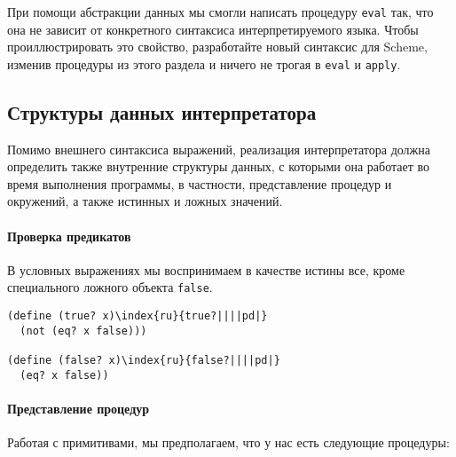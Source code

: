 \begin{exercise}{4.10}%
\label{EX4.10}%
При помощи 
абстракции данных мы смогли написать
процедуру {\tt eval} так, что она не зависит от конкретного
синтаксиса интерпретируемого языка.  
Чтобы проиллюстрировать это свойство,
разработайте новый синтаксис для Scheme, изменив процедуры из
этого раздела и ничего не трогая в {\tt eval} и
{\tt apply}.
\end{exercise}

\subsection{Структуры данных интерпретатора}
\label{EVALUATOR-DATA-STRUCTURES}%

Помимо внешнего синтаксиса выражений, реализация
интерпретатора дол\-жна определить также внутренние структуры данных, с
которыми она работает во время выполнения программы, в частности,
представление процедур и окружений, а также истинных и ложных
значений.

\paragraph{Проверка предикатов}

В условных выражениях мы воспринимаем в качестве истины
все, кроме специального ложного объекта {\tt false}.

\begin{Verbatim}[fontsize=\small]
(define (true? x)\index{ru}{true?||||pd|}
  (not (eq? x false)))

(define (false? x)\index{ru}{false?||||pd|}
  (eq? x false))
\end{Verbatim}

\paragraph{Представление процедур}

Работая с примитивами, мы предполагаем, что у нас есть
следующие процедуры:

